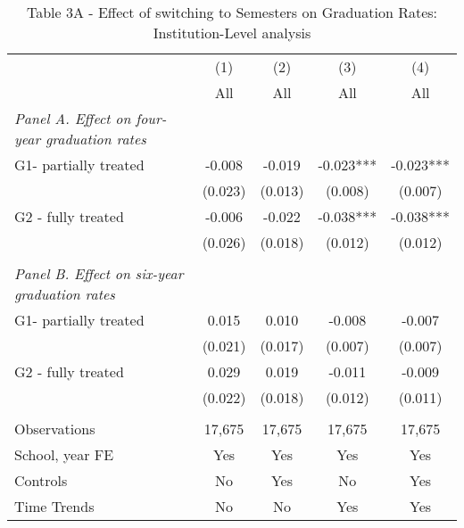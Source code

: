\documentclass[8pt]{article}
\begin{document}
\setlength{\pdfpagewidth}{8in} \setlength{\pdfpageheight}{11in}
\begin{table}
\captionsetup{skip=0pt}
\captionsetup{font=scriptsize}
\caption*{Table 3A - Effect of switching to Semesters on Graduation Rates: Institution-Level analysis } 
\begin{tabular}{lcccc}  \hline
 & (1) & (2) & (3) & (4) \\
 & All & All & All & All \\ \hline
 \textit{Panel A. Effect on four-year graduation rates}\\
G1- partially treated & -0.008 & -0.019 & -0.023*** & -0.023*** \\
 & (0.023) & (0.013) & (0.008) & (0.007) \\
G2 - fully treated & -0.006 & -0.022 & -0.038*** & -0.038*** \\
 & (0.026) & (0.018) & (0.012) & (0.012) \\
 &  &  &  &    \\
 \textit{Panel B. Effect on six-year graduation rates}\\
G1- partially treated & 0.015 & 0.010 & -0.008 & -0.007 \\
 & (0.021) & (0.017) & (0.007) & (0.007) \\
G2 - fully treated & 0.029 & 0.019 & -0.011 & -0.009 \\
 & (0.022) & (0.018) & (0.012) & (0.011) \\
 &  &  &  &  \\

Observations & 17,675 & 17,675 & 17,675 & 17,675 \\

School, year FE & Yes & Yes & Yes & Yes \\
Controls & No & Yes & No & Yes \\
 Time Trends & No & No & Yes & Yes \\ \hline

\end{tabular}
\end{table}
\end{document}

